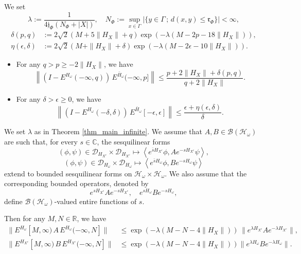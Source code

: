 \documentclass[10pt,a4paper]{amsart}
\begin{document}
\begin{theorem}\label{thm_main_infinite}
We set
\[
\lambda:=\frac{1}{4\mathfrak{j}_\Phi(N_\Phi+|X|)}, \quad N_\Phi:=\sup_{x\in\Gamma} |\{ y\in\Gamma \,;\, d(x,y)\leq \mathfrak{r}_\Phi\}|<\infty,
\]
\begin{align*}
\delta(p,q)&:=2\sqrt{2}(M+5\|H_X\|+q) \exp(-\lambda(M-2p-18\|H_X\|)),\\
\eta(\epsilon,\delta)&:=2\sqrt{2}(M+\|H_X\|+\delta) \exp(-\lambda(M-2\epsilon-10\|H_X\|)).
\end{align*}
\begin{itemize}
\item[(i)] For any $q>p\geq-2\|H_X\|$, we have
\[
\left\|\left(I-E^{H_\omega}(-\infty,q)\right)\,
E^{\bar{H}_\omega}(-\infty,p]\right\|
\leq\frac{p+2\|H_X\|+\delta(p,q)}{q+2\|H_X\|}.
\]
\item[(ii)] For any $\delta>\epsilon\geq0$, we have
\[
\left\|\left(I-E^{H_\omega}(-\delta,\delta)\right)\,
E^{\bar{H}_\omega}[-\epsilon,\epsilon]\right\|
\leq\frac{\epsilon+\eta(\epsilon,\delta)}{\delta}.
\]
\end{itemize}
\end{theorem}

\begin{proposition}\label{prop_AKL}
We set $\lambda$ as in Theorem \ref{thm_main_infinite}. We assume that $A,B\in\mathcal{B}(\mathcal{H}_\omega)$ are such that, for every $s\in\mathbb{C}$, the sesquilinear forms
\[
(\phi,\psi)\in\mathcal{D}_{H_{X^c}}\times\mathcal{D}_{H_{X^c}}
\mapsto
\left\langle e^{\bar{s} H_{X^c}}\phi,
A e^{-sH_{X^c}}\psi\right\rangle,
\]
\[
(\phi,\psi)\in\mathcal D_{H_\omega}\times \mathcal D_{H_\omega}
\mapsto
\left\langle e^{\bar{s} H_\omega}\phi,
B e^{-sH_\omega} \psi\right\rangle
\]
extend to bounded sesquilinear forms on $\mathcal{H}_\omega\times\mathcal{H}_\omega$. We also assume that the corresponding bounded operators, denoted by
\[
e^{sH_{X^c}}Ae^{-sH_{X^c}},\quad e^{sH_\omega}Be^{-sH_\omega},
\]
define $\mathcal{B}(\mathcal H_\omega)$-valued entire functions of $s$.

Then for any $M,N\in\mathbb{R}$, we have
\begin{align*}
\|E^{H_\omega}[M,\infty) \,A\,
E^{H_\omega}(-\infty,N]\|
&\leq\exp(-\lambda(M-N-4\|H_X\|))\,
\|e^{\lambda H_{X^c}}Ae^{-\lambda H_{X^c}}\|,\\
\|E^{H_{X^c}}[M,\infty) \,B\,
E^{H_{X^c}}(-\infty,N]\|
&\leq\exp(-\lambda(M-N-4\|H_X\|))
\|e^{\lambda H_\omega}Be^{-\lambda H_\omega}\|.
\end{align*}
\end{proposition}
\end{document}
